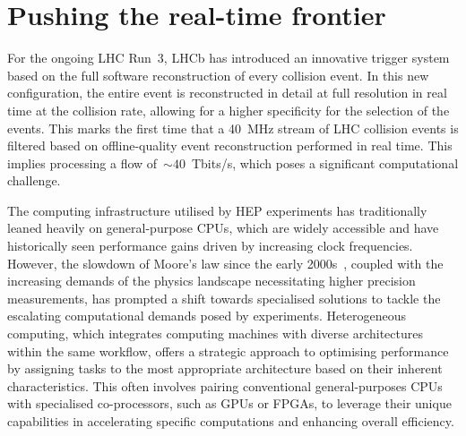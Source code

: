 


\section{Pushing the real-time frontier}
For the ongoing LHC Run~3, LHCb has introduced an innovative trigger system based on the full software reconstruction of every collision event. In this new configuration, the entire event is reconstructed in detail at full resolution in real time at the collision rate, allowing for a higher specificity for the selection of the events. This marks the first time that a \SI{40}{\mega\hertz} stream of LHC collision events is filtered based on offline-quality event reconstruction performed in real time. This implies processing a flow of~$\sim 40$~Tbits/s, which poses a significant computational challenge. 

The computing infrastructure utilised by HEP experiments has traditionally leaned heavily on general-purpose CPUs, which are widely accessible and have historically seen performance gains driven by increasing clock frequencies. However, the slowdown of Moore's law since the early 2000s~\cite{Tuomi_2002}, coupled with the increasing demands of the physics landscape necessitating higher precision measurements, has prompted a shift towards specialised solutions to tackle the escalating computational demands posed by experiments. Heterogeneous computing, which integrates computing machines with diverse architectures within the same workflow, offers a strategic approach to optimising performance by assigning tasks to the most appropriate architecture based on their inherent characteristics. This often involves pairing conventional general-purposes CPUs with specialised co-processors, such as GPUs or FPGAs, to leverage their unique capabilities in accelerating specific computations and enhancing overall efficiency.

